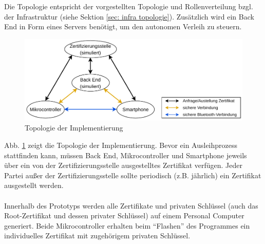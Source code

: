 Die Topologie entspricht der vorgestellten Topologie und Rollenverteilung bzgl. der Infrastruktur (siehe Sektion \ref{sec: infra topologie}). Zusätzlich wird ein Back End in Form eines Servers benötigt, um den autonomen Verleih zu steuern.
\begin{figure}[H]
    \centering
    \includegraphics[width=1\textwidth]{graphics/impl_topologie.pdf}
    \caption[Topologie der Implementierung]{Topologie der Implementierung}
    \label{fig: impl topo}
\end{figure}
Abb. \ref{fig: impl topo} zeigt die Topologie der Implementierung. Bevor ein Ausleihprozess stattfinden kann, müssen Back End, Mikrocontroller und Smartphone jeweils über ein von der Zertifizierungsstelle ausgestelltes Zertifikat verfügen. Jeder Partei außer der Zertifizierungsstelle sollte periodisch (z.B. jährlich) ein Zertifikat ausgestellt werden.
\\\\
Innerhalb des Prototyps werden alle Zertifikate und privaten Schlüssel (auch das Root-Zertifikat und dessen privater Schlüssel) auf einem Personal Computer generiert. Beide Mikrocontroller erhalten beim "`Flashen"' des Programmes ein individuelles Zertifikat mit zugehörigem privaten Schlüssel.
